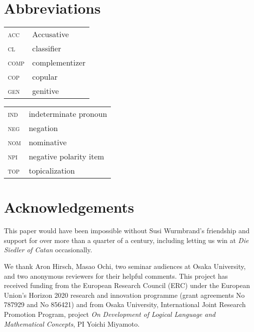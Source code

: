 \documentclass[output=paper,colorlinks,citecolor=brown,
]{langscibook}
\begin{document}
\section*{Abbreviations}
\begin{tabularx}{.5\textwidth}{lQ}
\textsc{acc}  & Accusative       \\
\textsc{cl}   & classifier      \\
\textsc{comp} & complementizer    \\
\textsc{cop}  & copular        \\
\textsc{gen}  & genitive       \\      
\end{tabularx}
\begin{tabularx}{.5\textwidth}{lQ}
\textsc{ind} & indeterminate pronoun         \\
 \textsc{neg} & negation               \\
 \textsc{nom} & nominative             \\
\textsc{npi} & negative polarity item \\
\textsc{top} & topicalization        \\
\end{tabularx}

\section*{Acknowledgements}

This paper would have been impossible without Susi Wurmbrand's friendship and support for over more than a quarter of a century, including letting us win at \emph{Die Siedler of Catan} occasionally.

We thank Aron Hirsch, Masao Ochi, two seminar audiences at Osaka University, and two anonymous reviewers for their helpful comments.  This project has received funding from the European Research Council (ERC) under the European Union's Horizon 2020 research and innovation programme (grant agreements No 787929 and No 856421) and from Osaka University, International Joint Research Promotion Program, project \emph{On Development of Logical Language and Mathematical Concepts}, PI Yoichi Miyamoto.

\printbibliography[heading=subbibliography,notkeyword=this]
\end{document}
